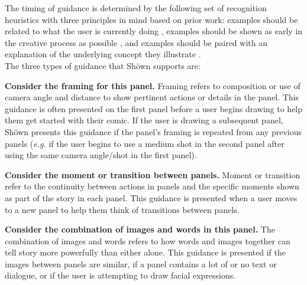 The timing of guidance is determined by the following set of recognition heuristics with three principles in mind based on prior work: examples should be related to what the user is currently doing \cite{fraser2019replay,kandel2011wrangler,kumar2011, Lee2010, ngoon2018interactive}, examples should be shown as early in the creative process as possible \cite{kulkarni2012early,Siangliulue}, and examples should be paired with an explanation of the underlying concept they illustrate \cite{javadi2012impact,ngoon2018interactive}.
\\
The three types of guidance that Sh{\"o}wn supports are:

\textbf{Consider the framing for this panel.} Framing refers to composition or use of camera angle and distance to show pertinent actions or details in the panel. This guidance is often presented on the first panel before a user begins drawing to help them get started with their comic. If the user is drawing a subsequent panel, Sh{\"o}wn presents this guidance if the panel’s framing is repeated from any previous panels (\textit{e.g.} if the user begins to use a medium shot in the second panel after using the same camera angle/shot in the first panel). 

\textbf{Consider the moment or transition between panels.} Moment or transition refer to the continuity between actions in panels and the specific moments shown as part of the story in each panel. This guidance is presented when a user moves to a new panel to help them think of transitions between panels.

\textbf{Consider the combination of images and words in this panel.} The combination of images and words refers to how words and images together can tell story more powerfully than either alone. This guidance is presented if the images between panels are similar, if a panel contains a lot of or no text or dialogue, or if the user is attempting to draw facial expressions. 

